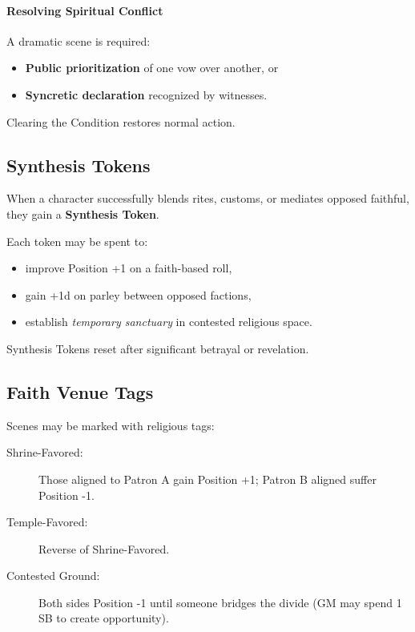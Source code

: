 \documentclass[11pt]{article}
\begin{document}
\paragraph*{Resolving Spiritual Conflict}
A dramatic scene is required:

\begin{itemize}
  \item \textbf{Public prioritization} of one vow over another, or
  \item \textbf{Syncretic declaration} recognized by witnesses.
\end{itemize}

Clearing the Condition restores normal action.

\subsection{Synthesis Tokens}

When a character successfully blends rites, customs, or mediates
opposed faithful, they gain a \textbf{Synthesis Token}.

Each token may be spent to:

\begin{itemize}
  \item improve Position +1 on a faith-based roll,
  \item gain +1d on parley between opposed factions,
  \item establish \emph{temporary sanctuary} in contested religious space.
\end{itemize}

Synthesis Tokens reset after significant betrayal or revelation.

\subsection{Faith Venue Tags}

Scenes may be marked with religious tags:

\begin{description}
  \item[Shrine-Favored:] Those aligned to Patron A gain Position +1;
  Patron B aligned suffer Position -1.
  \item[Temple-Favored:] Reverse of Shrine-Favored.
  \item[Contested Ground:] Both sides Position -1 until someone bridges
  the divide (GM may spend 1 SB to create opportunity).
\end{description}
\end{document}
